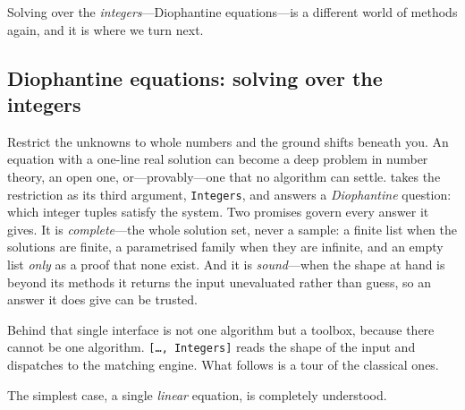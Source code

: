 
Solving over the \emph{integers}---Diophantine equations---is a different world of methods
again, and it is where we turn next.

\subsection{Diophantine equations: solving over the integers}
\label{ssec:alg-diophantine}

Restrict the unknowns to whole numbers and the ground shifts beneath you. An equation
with a one-line real solution can become a deep problem in number theory, an open one,
or---provably---one that no algorithm can settle.  takes the restriction as its
third argument, \texttt{Integers}, and answers a \emph{Diophantine} question: which integer tuples satisfy the system. Two promises govern every
answer it gives. It is \emph{complete}---the whole solution set, never a sample: a finite
list when the solutions are finite, a parametrised family when they are infinite, and an
empty list \emph{only} as a proof that none exist. And it is \emph{sound}---when the shape
at hand is beyond its methods it returns the input unevaluated rather than guess, so an
answer it does give can be trusted.

Behind that single interface is not one algorithm but a toolbox, because there cannot be
one algorithm. \texttt{[\ldots, Integers]} reads the shape of the input and
dispatches to the matching engine. What follows is a tour of the classical ones.

The simplest case, a single \emph{linear} equation, is completely understood.

\begin{codepairs}
\end{codepairs}

